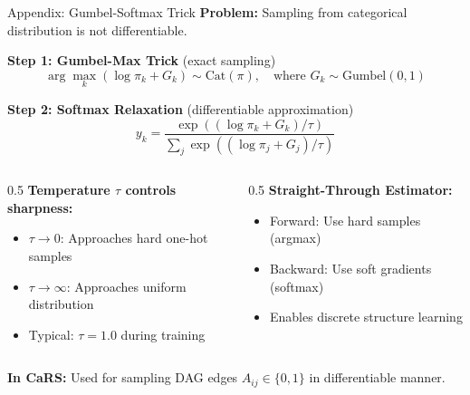 \documentclass[aspectratio=169]{beamer}
\begin{document}
\begin{frame}{Appendix: Gumbel-Softmax Trick}
\textbf{Problem:} Sampling from categorical distribution is not differentiable.

\vspace{0.2cm}
\textbf{Step 1: Gumbel-Max Trick} (exact sampling)
\begin{equation*}
\arg\max_k \left(\log \pi_k + G_k\right) \sim \text{Cat}(\pi), \quad \text{where } G_k \sim \text{Gumbel}(0,1)
\end{equation*}

\textbf{Step 2: Softmax Relaxation} (differentiable approximation)
\begin{equation*}
y_k = \frac{\exp((\log \pi_k + G_k) / \tau)}{\sum_j \exp((\log \pi_j + G_j) / \tau)}
\end{equation*}

\begin{columns}
\begin{column}{0.5\textwidth}
\textbf{Temperature $\tau$ controls sharpness:}
\begin{itemize}
    \item $\tau \to 0$: Approaches hard one-hot samples
    \item $\tau \to \infty$: Approaches uniform distribution
    \item Typical: $\tau = 1.0$ during training
\end{itemize}
\end{column}

\begin{column}{0.5\textwidth}
\textbf{Straight-Through Estimator:}
\begin{itemize}
    \item Forward: Use hard samples (argmax)
    \item Backward: Use soft gradients (softmax)
    \item Enables discrete structure learning
\end{itemize}
\end{column}
\end{columns}

\vspace{0.2cm}
\textbf{In CaRS:} Used for sampling DAG edges $A_{ij} \in \{0,1\}$ in differentiable manner.
\end{frame}
\end{document}
